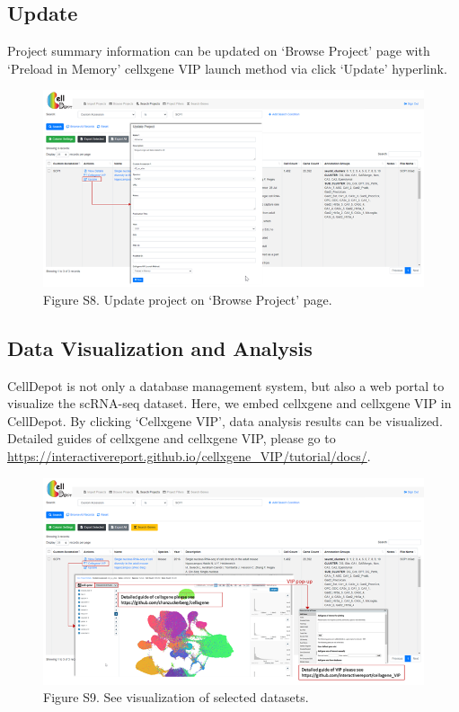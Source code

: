 \documentclass[
]{book}
\begin{document}
\hypertarget{update}{%
\subsection{Update}\label{update}}

Project summary information can be updated on `Browse Project' page with `Preload in Memory' cellxgene VIP launch method via click `Update' hyperlink.

\begin{figure}
\centering
\includegraphics{figures/s10.png}
\caption{Figure S8. Update project on `Browse Project' page.}
\end{figure}

\hypertarget{data-visualization-and-analysis}{%
\subsection{Data Visualization and Analysis}\label{data-visualization-and-analysis}}

CellDepot is not only a database management system, but also a web portal to visualize the scRNA-seq dataset. Here, we embed cellxgene and cellxgene VIP in CellDepot. By clicking `Cellxgene VIP', data analysis results can be visualized. Detailed guides of cellxgene and cellxgene VIP, please go to \url{https://interactivereport.github.io/cellxgene_VIP/tutorial/docs/}.

\begin{figure}
\centering
\includegraphics{figures/S11.png}
\caption{Figure S9. See visualization of selected datasets.}
\end{figure}
\end{document}
